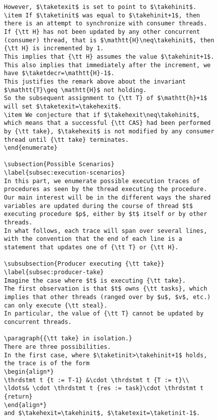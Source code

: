 \documentclass[a4paper]{article}
\begin{document}
{\begin{figure}
\begin{lstlisting}
However, $\taketexit$ is set to point to $\takehinit$.
\item If $\taketinit$ was equal to $\takehinit+1$, then there is an attempt to synchronize with consumer threads.
If {\tt H} has not been updated by any other concurrent (consumer) thread, that is $\mathtt{H}\neq\takehinit$, then {\tt H} is incremented by 1.
This implies that {\tt H} assumes the value $\takehinit+1$.
This also implies that immediately after the increment, we have $\taketdecr=\mathtt{H}-1$. 
This justifies the remark above about the invariant $\mathtt{T}\geq \mathtt{H}$ not holding.
So the subsequent assignment to {\tt T} of $\mathtt{h}+1$ will set $\taketexit=\takehexit$. 
\item We conjecture that if $\takehexit\neq\takehinit$, which means that a successful {\tt CAS} had been performed by {\tt take}, $\takehexit$ is not modified by any consumer thread until {\tt take} terminates.
\end{enumerate}

\subsection{Possible Scenarios}
\label{subsec:execution-scenarios}
In this part, we enumerate possible execution traces of procedures as seen by the thread executing the procedure.
Our main interest will be in the different ways the shared variables are updated during the course of thread $t$ executing procedure $p$, either by $t$ itself or by other threads.
In what follows, each trace will span over several lines, with the convention that the end of each line is a statement that updates one of {\tt T} or {\tt H}.

\subsubsection{Producer executing {\tt take}}
\label{subsec:producer-take}
Imagine the case where $t$ is executing {\tt take}. 
The first observation is that $t$ owns {\tt tasks}, which implies that other threads (ranged over by $u$, $v$, etc.) can only execute {\tt steal}.
In particular, the value of {\tt T} cannot be updated by concurrent threads.

\paragraph{{\tt take} in isolation.}
There are three possibilities.
In the first case, where $\taketinit>\takehinit+1$ holds, the trace is of the form 
\begin{align*}
\thrdstmt t {t := T-1} &\cdot \thrdstmt t {T := t}\\
\ldots& \cdot \thrdstmt t {res := task}\cdot \thrdstmt t {return}
\end{align*}
and $\takehexit=\takehinit$, $\taketexit=\taketinit-1$.


\end{lstlisting}
\end{figure}}
\end{document}
